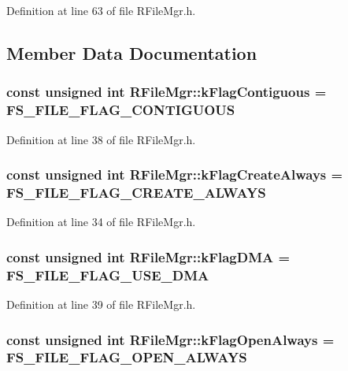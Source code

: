 Definition at line 63 of file RFileMgr.h.

\subsection{Member Data Documentation}
\hypertarget{class_r_file_mgr_5be34be75972f8996d64b9310cbb1e27}{
\subsubsection[{kFlagContiguous}]{\setlength{\rightskip}{0pt plus 5cm}const unsigned int {\bf RFileMgr::kFlagContiguous} = FS\_\-FILE\_\-FLAG\_\-CONTIGUOUS}}
\label{class_r_file_mgr_5be34be75972f8996d64b9310cbb1e27}




Definition at line 38 of file RFileMgr.h.\hypertarget{class_r_file_mgr_7a2b1f90a235a749b3c08e2839ceb16b}{
\subsubsection[{kFlagCreateAlways}]{\setlength{\rightskip}{0pt plus 5cm}const unsigned int {\bf RFileMgr::kFlagCreateAlways} = FS\_\-FILE\_\-FLAG\_\-CREATE\_\-ALWAYS}}
\label{class_r_file_mgr_7a2b1f90a235a749b3c08e2839ceb16b}




Definition at line 34 of file RFileMgr.h.\hypertarget{class_r_file_mgr_6e99814567b23b9c78cb6c67297b195c}{
\subsubsection[{kFlagDMA}]{\setlength{\rightskip}{0pt plus 5cm}const unsigned int {\bf RFileMgr::kFlagDMA} = FS\_\-FILE\_\-FLAG\_\-USE\_\-DMA}}
\label{class_r_file_mgr_6e99814567b23b9c78cb6c67297b195c}




Definition at line 39 of file RFileMgr.h.\hypertarget{class_r_file_mgr_d7c0ae342eb6917fac67e2e7fa48c3d1}{
\subsubsection[{kFlagOpenAlways}]{\setlength{\rightskip}{0pt plus 5cm}const unsigned int {\bf RFileMgr::kFlagOpenAlways} = FS\_\-FILE\_\-FLAG\_\-OPEN\_\-ALWAYS}}
\label{class_r_file_mgr_d7c0ae342eb6917fac67e2e7fa48c3d1}




